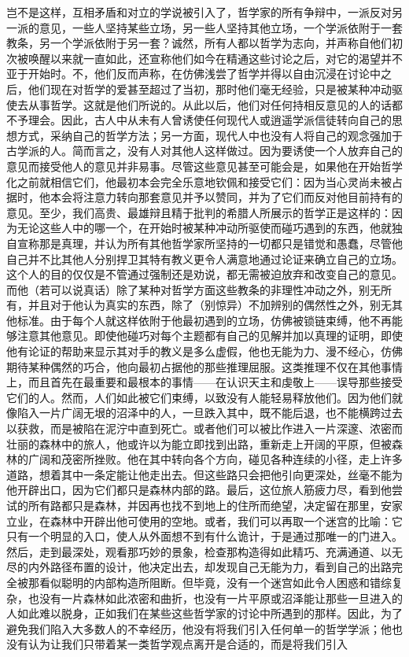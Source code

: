 岂不是这样，互相矛盾和对立的学说被引入了，哲学家的所有争辩中，一派反对另一派的意见，一些人坚持某些立场，另一些人坚持其他立场，一个学派依附于一套教条，另一个学派依附于另一套？诚然，所有人都以哲学为志向，并声称自他们初次被唤醒以来就一直如此，还宣称他们如今在精通这些讨论之后，对它的渴望并不亚于开始时。不，他们反而声称，在仿佛浅尝了哲学并得以自由沉浸在讨论中之后，他们现在对哲学的爱甚至超过了当初，那时他们毫无经验，只是被某种冲动驱使去从事哲学。这就是他们所说的。从此以后，他们对任何持相反意见的人的话都不予理会。因此，古人中从未有人曾诱使任何现代人或逍遥学派信徒转向自己的思想方式，采纳自己的哲学方法；另一方面，现代人中也没有人将自己的观念强加于古学派的人。简而言之，没有人对其他人这样做过。因为要诱使一个人放弃自己的意见而接受他人的意见并非易事。尽管这些意见甚至可能会是，如果他在开始哲学化之前就相信它们，他最初本会完全乐意地钦佩和接受它们：因为当心灵尚未被占据时，他本会将注意力转向那套意见并予以赞同，并为了它们而反对他目前持有的意见。至少，我们高贵、最雄辩且精于批判的希腊人所展示的哲学正是这样的：因为无论这些人中的哪一个，在开始时被某种冲动所驱使而碰巧遇到的东西，他就独自宣称那是真理，并认为所有其他哲学家所坚持的一切都只是错觉和愚蠢，尽管他自己并不比其他人分别捍卫其特有教义更令人满意地通过论证来确立自己的立场。这个人的目的仅仅是不管通过强制还是劝说，都无需被迫放弃和改变自己的意见。而他（若可以说真话）除了某种对哲学方面这些教条的非理性冲动之外，别无所有，并且对于他认为真实的东西，除了（别惊异）不加辨别的偶然性之外，别无其他标准。由于每个人就这样依附于他最初遇到的立场，仿佛被锁链束缚，他不再能够注意其他意见。即使他碰巧对每个主题都有自己的见解并加以真理的证明，即使他有论证的帮助来显示其对手的教义是多么虚假，他也无能为力、漫不经心，仿佛期待某种偶然的巧合，他向最初占据他的那些推理屈服。这类推理不仅在其他事情上，而且首先在最重要和最根本的事情——在认识天主和虔敬上——误导那些接受它们的人。然而，人们如此被它们束缚，以致没有人能轻易释放他们。因为他们就像陷入一片广阔无垠的沼泽中的人，一旦跌入其中，既不能后退，也不能横跨过去以获救，而是被陷在泥泞中直到死亡。或者他们可以被比作进入一片深邃、浓密而壮丽的森林中的旅人，他或许以为能立即找到出路，重新走上开阔的平原，但被森林的广阔和茂密所挫败。他在其中转向各个方向，碰见各种连续的小径，走上许多道路，想着其中一条定能让他走出去。但这些路只会把他引向更深处，丝毫不能为他开辟出口，因为它们都只是森林内部的路。最后，这位旅人筋疲力尽，看到他尝试的所有路都只是森林，并因再也找不到地上的住所而绝望，决定留在那里，安家立业，在森林中开辟出他可使用的空地。或者，我们可以再取一个迷宫的比喻：它只有一个明显的入口，使人从外面想不到有什么诡计，于是通过那唯一的门进入。然后，走到最深处，观看那巧妙的景象，检查那构造得如此精巧、充满通道、以无尽的内外路径布置的设计，他决定出去，却发现自己无能为力，看到自己的出路完全被那看似聪明的内部构造所阻断。但毕竟，没有一个迷宫如此令人困惑和错综复杂，也没有一片森林如此浓密和曲折，也没有一片平原或沼泽能让那些一旦进入的人如此难以脱身，正如我们在某些这些哲学家的讨论中所遇到的那样。因此，为了避免我们陷入大多数人的不幸经历，他没有将我们引入任何单一的哲学学派；他也没有认为让我们只带着某一类哲学观点离开是合适的，而是将我们引入